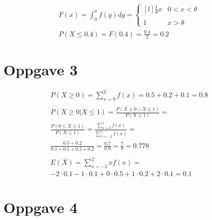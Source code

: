 \begin{minipage}{0.5\textwidth}
\end{minipage}%
\hfill
\begin{minipage}{0.5\textwidth}
	\begin{gather*}
		F(x) = \int_0^x{f(y) dy}
		=
		\left\{
			\begin{matrix*}[l]
				\frac{1}{\theta} x	& 0 < x < \theta \\ \\
				1					& x > \theta
			\end{matrix*}
		\right.
		\\
		P(X \leq 0.4) = F(0.4) = \frac{0.4}{2} = 0.2
	\end{gather*}
\end{minipage}%

\newpage

\section*{Oppgave 3}

\begin{gather*}
	P(X \geq 0) = \sum_{x = 0}^2{f(x)} = 0.5 + 0.2 + 0.1 = 0.8
	\\
	\\
	P(X \geq 0 | X \leq 1) = \frac{P(X \geq 0 \cup X \leq 1)}{P(X \leq 1)}
	=
	\\
	\frac{P(0 \leq X \leq 1)}{P(X \leq 1)} = \frac{\sum_{x = 0}^1{f(x)}}{\sum_{x = -2}^1{f(x)}}
	=
	\\
	\frac{0.5 + 0.2}{0.1 + 0.1 + 0.5 + 0.2} = \frac{0.7}{0.9} = \frac{7}{9} = 0.778
	\\
	\\
	E(X) = \sum_{x = -2}^2{x f(x)} =
	\\
	-2 \cdot 0.1 - 1 \cdot 0.1 + 0 \cdot 0.5 + 1 \cdot 0.2 + 2 \cdot 0.1
	= 0.1
\end{gather*}


\section*{Oppgave 4}

